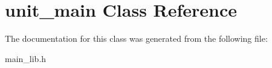 \hypertarget{classunit__main}{}\section{unit\+\_\+main Class Reference}
\label{classunit__main}


The documentation for this class was generated from the following file\+:\begin{DoxyCompactItemize}
\item 
main\+\_\+lib.\+h\end{DoxyCompactItemize}
